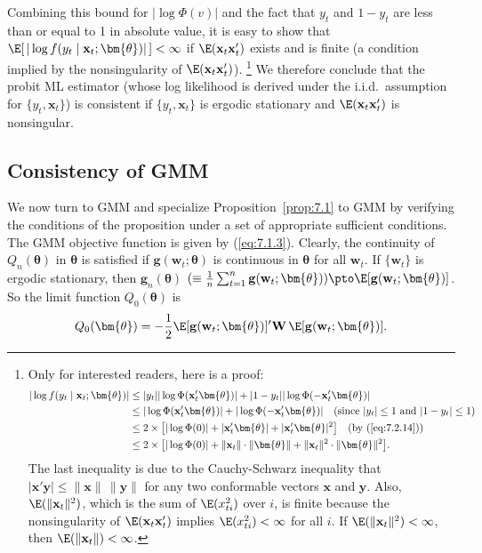 \begin{example}
Combining this bound for $|\log \Phi(v)|$ and the fact that $y_t$ and $1 - y_t$ are less than or equal to 1 in absolute value, it is easy to show that $\E[\,|\log f(y_t \mid \mathbf{x}_t; \bm{\theta})|\,] < \infty$ if $\E(\mathbf{x}_t \mathbf{x}_t')$ exists and is finite (a condition implied by the nonsingularity of $\E(\mathbf{x}_t \mathbf{x}_t')$).%
\footnote{Only for interested readers, here is a proof:
\begin{align*}
|\log f(y_t \mid \mathbf{x}_t; \bm{\theta})| &\leq |y_t| |\log \Phi(\mathbf{x}_t' \bm{\theta})| + |1 - y_t| |\log \Phi(-\mathbf{x}_t' \bm{\theta})| \\
&\leq |\log \Phi(\mathbf{x}_t' \bm{\theta})| + |\log \Phi(-\mathbf{x}_t' \bm{\theta})| \quad (\text{since } |y_t| \leq 1 \text{ and } |1 - y_t| \leq 1) \\
&\leq 2 \times \bigl[ |\log \Phi(0)| + |\mathbf{x}_t' \bm{\theta}| + |\mathbf{x}_t' \bm{\theta}|^2 \bigr] \quad (\text{by } (\ref{eq:7.2.14})) \\
&\leq 2 \times \bigl[ |\log \Phi(0)| + \|\mathbf{x}_t\| \cdot \|\bm{\theta}\| + \|\mathbf{x}_t\|^2 \cdot \|\bm{\theta}\|^2 \bigr].
\end{align*}
The last inequality is due to the Cauchy-Schwarz inequality that $|\mathbf{x}'\mathbf{y}| \leq \|\mathbf{x}\| \, \|\mathbf{y}\|$ for any two conformable vectors $\mathbf{x}$ and $\mathbf{y}$. Also, $\E(\|\mathbf{x}_t\|^2)$, which is the sum of $\E(x_{ti}^2)$ over $i$, is finite because the nonsingularity of $\E(\mathbf{x}_t \mathbf{x}_t')$ implies $\E(x_{ti}^2) < \infty$ for all $i$. If $\E(\|\mathbf{x}_t\|^2) < \infty$, then $\E(\|\mathbf{x}_t\|) < \infty$.}
We therefore conclude that the probit ML estimator (whose log likelihood is derived under the i.i.d.\ assumption for $\{y_t, \mathbf{x}_t\}$) is consistent if $\{y_t, \mathbf{x}_t\}$ is ergodic stationary and $\E(\mathbf{x}_t \mathbf{x}_t')$ is nonsingular.
\end{example}

\subsection*{Consistency of GMM}

We now turn to GMM and specialize Proposition~\ref{prop:7.1} to GMM by verifying the conditions of the proposition under a set of appropriate sufficient conditions. The GMM objective function is given by (\ref{eq:7.1.3}). Clearly, the continuity of $Q_n(\bm{\theta})$ in $\bm{\theta}$ is satisfied if $\mathbf{g}(\mathbf{w}_t; \bm{\theta})$ is continuous in $\bm{\theta}$ for all $\mathbf{w}_t$. If $\{\mathbf{w}_t\}$ is ergodic stationary, then $\mathbf{g}_n(\bm{\theta})$ $(\equiv \frac{1}{n}\sum_{t=1}^{n} \mathbf{g}(\mathbf{w}_t; \bm{\theta})) \pto \E[\mathbf{g}(\mathbf{w}_t; \bm{\theta})]$. So the limit function $Q_0(\bm{\theta})$ is
\begin{equation}
\label{eq:7.2.15}
Q_0(\bm{\theta}) = -\frac{1}{2}\E[\mathbf{g}(\mathbf{w}_t; \bm{\theta})]' \mathbf{W} \, \E[\mathbf{g}(\mathbf{w}_t; \bm{\theta})].
\end{equation}

